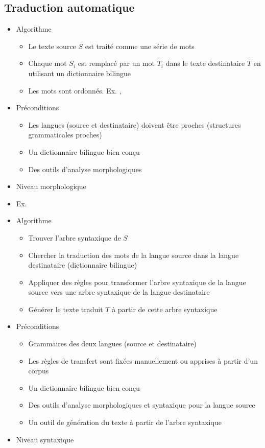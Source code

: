 \documentclass{KodeBook}
\begin{document}
\subsection{Traduction automatique}


\begin{itemize}
	\item Algorithme
	\begin{itemize}
		\item Le texte source $S$ est traité comme une série de mots 
		\item Chaque mot $S_i$ est remplacé par un mot $T_i$ dans le texte destinataire $T$ en utilisant un dictionnaire bilingue
		\item Les mots sont ordonnés. Ex. , 
	\end{itemize}
	\item Préconditions 
	\begin{itemize}
		\item Les langues (source et destinataire) doivent être proches (structures grammaticales proches)
		\item Un dictionnaire bilingue bien conçu
		\item Des outils d'analyse morphologiques 
	\end{itemize}
	\item Niveau morphologique 
	\item Ex. 
\end{itemize}

\begin{itemize}
	\item Algorithme
	\begin{itemize}
		\item Trouver l'arbre syntaxique de $S$
		\item Chercher la traduction des mots de la langue source dans la langue destinataire (dictionnaire bilingue)
		\item Appliquer des règles pour transformer l'arbre syntaxique de la langue source vers une arbre syntaxique de la langue destinataire
		\item Générer le texte traduit $T$ à partir de cette arbre syntaxique
	\end{itemize}
	\item Préconditions 
	\begin{itemize}
		\item Grammaires des deux langues (source et destinataire)
		\item Les règles de transfert sont fixées manuellement ou apprises à partir d'un corpus
		\item Un dictionnaire bilingue bien conçu
		\item Des outils d'analyse morphologiques et syntaxique pour la langue source
		\item Un outil de génération du texte à partir de l'arbre syntaxique
	\end{itemize}
	\item Niveau syntaxique 
\end{itemize}
\end{document}
